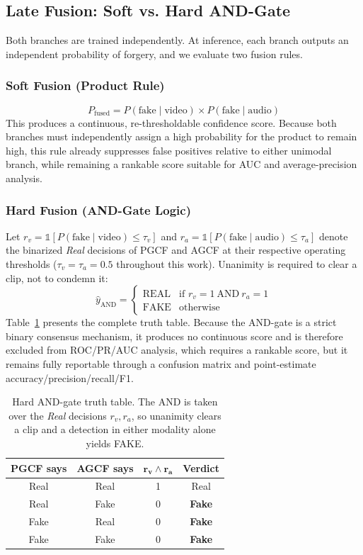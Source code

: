 \documentclass[conference]{IEEEtran}
\begin{document}
\subsection{Late Fusion: Soft vs. Hard AND-Gate}
Both branches are trained independently. At inference, each branch outputs an independent probability of forgery, and we evaluate two fusion rules.

\subsubsection{Soft Fusion (Product Rule)}
\begin{equation}
P_{\text{fused}} = P(\text{fake}\mid\text{video}) \times P(\text{fake}\mid\text{audio})
\end{equation}
This produces a continuous, re-thresholdable confidence score. Because both branches must independently assign a high probability for the product to remain high, this rule already suppresses false positives relative to either unimodal branch, while remaining a rankable score suitable for AUC and average-precision analysis.

\subsubsection{Hard Fusion (AND-Gate Logic)}
Let $r_v = \mathbb{1}[P(\text{fake}\mid\text{video}) \le \tau_v]$ and $r_a = \mathbb{1}[P(\text{fake}\mid\text{audio}) \le \tau_a]$ denote the binarized \emph{Real} decisions of PGCF and AGCF at their respective operating thresholds ($\tau_v = \tau_a = 0.5$ throughout this work). Unanimity is required to clear a clip, not to condemn it:
\begin{equation}
\hat y_{\text{AND}} = \begin{cases} \text{REAL} & \text{if } r_v = 1 \ \text{AND} \ r_a = 1 \\ \text{FAKE} & \text{otherwise} \end{cases}
\end{equation}
Table~\ref{tab:truth} presents the complete truth table. Because the AND-gate is a strict binary consensus mechanism, it produces no continuous score and is therefore excluded from ROC/PR/AUC analysis, which requires a rankable score, but it remains fully reportable through a confusion matrix and point-estimate accuracy/precision/recall/F1.

\begin{table}[t]
\caption{Hard AND-gate truth table. The AND is taken over the \emph{Real} decisions $r_v, r_a$, so unanimity clears a clip and a detection in either modality alone yields FAKE.}
\label{tab:truth}
\centering
\small
\begin{tabular}{cccc}
\toprule
\textbf{PGCF says} & \textbf{AGCF says} & $\mathbf{r_v \wedge r_a}$ & \textbf{Verdict} \\
\midrule
Real & Real & 1 & Real \\
Real & Fake & 0 & \textbf{Fake} \\
Fake & Real & 0 & \textbf{Fake} \\
Fake & Fake & 0 & \textbf{Fake} \\
\bottomrule
\end{tabular}
\end{table}
\end{document}
